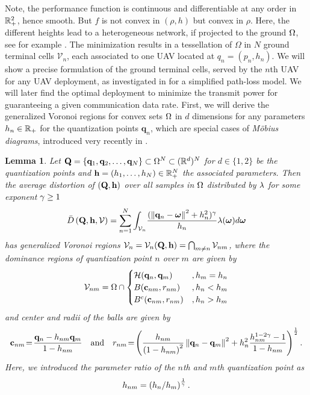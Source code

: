 \documentclass[12pt,onecolumn,journal,draftclsnofoot,letterpaper]{IEEEtran}
\newtheorem{lemma}{Lemma}
\newcounter{example}[section]
\renewcommand{\vp}{\mathbf q}
\renewcommand{\vP}{\mathbf Q}
\newcommand{\HS}{\ensuremath{\mathcal{H}}}          %
\newcommand{\df}{\ensuremath{\lam}}         %
\newcommand{\gP}{\ensuremath{\vP}}          %
\newcommand{\gp}{\ensuremath{\vp}}          %
\newcommand{\fH}{\ensuremath{\vh}}          %
\newcommand{\fh}{\ensuremath{h}}          %
\newcommand{\Vor}{\ensuremath{\mathcal{V}}}         %
\newcommand{\Dis}{\ensuremath{D}}                    %
\newcommand{\AvDis}{\ensuremath{\bar{\Dis}}}         %
\begin{document}
  Note, the performance function is continuous and differentiable at any order in ${\mathbb R}^2_+$, hence smooth. But $f$ is not
  convex in $(\rho,h)$ but convex in $\rho$. 
  Here, the different heights lead to a heterogeneous network, if projected to the ground $\Omega$, see for example
  \cite{GJ16a}.  The minimization results in a tessellation of $\Omega$ in $N$ ground terminal cells $\Vor_n$, each
  associated to one UAV located at $q_n=(p_n,h_n)$.  We will show a precise formulation of the ground terminal cells,
  served by the $n$th UAV for any UAV deployment, as investigated in \cite{MSBD16b} for a simplified path-loss model. We
  will later find the optimal deployment to minimize the transmit power for guaranteeing a given communication data rate.
  \fi
%
First, we will derive the generalized Voronoi regions for convex sets $\Omega$ in $d$ dimensions for any parameters
$h_n\in{\ensuremath{\mathbb R}}_+$  for the quantization points $\vp_n$, which are special cases of \emph{M{\"o}bius diagrams},
introduced very recently in \cite{BWY07}. 
%
\begin{lemma}\label{lem:moebiusdia}
  Let $\vP=\{\gp_1,\gp_2,\dots, \gp_N\}\subset \Omega^N\subset (\R^d)^N$ for $d\in\{1,2\}$ be the quantization points 
  and $\fH=(\fh_1,\dots,\fh_N)\in\R_+^N$  the associated parameters. Then the average distortion of $(\vP,\vh)$ 
  over all samples in $\Omega$ distributed by $\df$ for  some exponent $\gamma\geq1$ 
  \begin{align}
    \AvDis\left(\vP,\fH, \Vor\right) 
    = \sum_{n=1}^{N} \int_{\Vor_n} \! \frac{ (\Norm{\gp_n- \vome}^2 +h_n^2)^{\gam}}{h_n} \df(\vome)d\vome
       \label{eq:minimizationmoebius}
  \end{align}
  has generalized Voronoi regions $\Vor_n= \Vor_{n}(\gP,\fH)= \bigcap_{m\not=n} \Vor_{nm}$, 
  where the dominance regions of quantization point $n$ over $m$ are given by
  \begin{align}
    \Vor_{nm}=\Omega\cap\begin{cases}
         \HS(\gp_n,\gp_m)&, h_m=h_n \\
         B(\vc_{nm},r_{nm}) &, h_n<h_m\\
         B^c(\vc_{nm},r_{nm}) &, h_n>h_m 
        \end{cases}\label{eq:moebius}
  \end{align}
  and center and radii of the balls are given by
  \begin{align}
    \vc_{nm}\!=\!\frac{\gp_n - h_{nm}\gp_m}{1-h_{nm}}
    \quad\text{and}\quad 
    r_{nm}\!=\!\left(\frac{h_{nm}}{\left(1-h_{nm}\right)^2}\Norm{\gp_n-\gp_m}^2  + h_n^2 \frac{h_{nm}^{1-2\gam}
  -1}{1-h_{nm}}\right)^{\frac{1}{2}}.
  \label{eq:rnmcnm}
  \end{align}
  Here, we introduced the parameter ratio of the $n$th and $m$th quantization point as
  \begin{align}
    h_{nm}= \left(h_n/h_m\right)^{\frac{1}{\gamma}}.
  \end{align}
\end{lemma}
\end{document}

